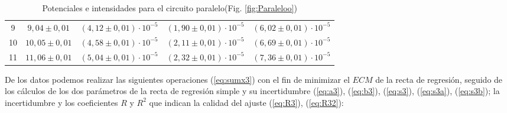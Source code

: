 \documentclass[11pt]{report}
\begin{document}
\begin{refsection}
\begin{table}[H]
\begin{tabular}{|c|c|c|c|c|}
9 & $9,04 \pm 0,01$ & $(4,12 \pm 0,01) \cdot 10^{-5}$ & $(1,90 \pm 0,01) \cdot 10^{-5}$ & $(6,02 \pm 0,01) \cdot 10^{-5}$ \\
10 & $10,05 \pm 0,01$ & $(4,58 \pm 0,01) \cdot 10^{-5}$ & $(2,11 \pm 0,01) \cdot 10^{-5}$ & $(6,69 \pm 0,01) \cdot 10^{-5}$ \\
11 & $11,06 \pm 0,01$ & $(5,04 \pm 0,01) \cdot 10^{-5}$ & $(2,32 \pm 0,01) \cdot 10^{-5}$ & $(7,36 \pm 0,01) \cdot 10^{-5}$ \\
\hline
\end{tabular}
\caption{Potenciales e intensidades para el circuito paralelo(Fig. \ref{fig:Paraleloo})}
\label{tab:Paralelo}
\end{table}

De los datos podemos realizar las siguientes operaciones (\ref{eq:sumx3}) 
con el fin de minimizar el $ECM$ de la recta de regresión, seguido de los cálculos de los dos parámetros de la 
recta de regresión simple y su incertidumbre (\ref{eq:a3}), (\ref{eq:b3}), (\ref{eq:s3}), (\ref{eq:s3a}), (\ref{eq:s3b});
la incertidumbre y los coeficientes $R$ y $R^2$ que indican la calidad del ajuste (\ref{eq:R3}), (\ref{eq:R32}):


\end{refsection}
\end{document}
